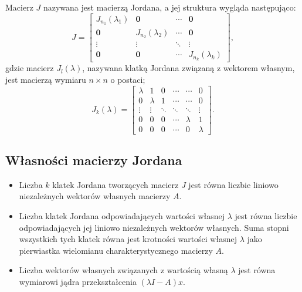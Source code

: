 \documentclass{article}
\begin{document}
Macierz $J$ nazywana jest macierzą Jordana, a jej struktura wygląda następująco:
$$
    J = 
    \left[
    \begin{array}{ccccc}
        J_{n_1}(\lambda_{1})    &   \mathbf{0}              &   \cdots  &   \mathbf{0}\\
        \mathbf{0}              &   J_{n_2}(\lambda_{2})    &   \cdots  &   \mathbf{0}\\
        \vdots                  &   \vdots                  &   \ddots  &   \vdots\\
        \mathbf{0}              &   \mathbf{0}              &   \cdots  &   J_{n_k}(\lambda_{k})
    \end{array}
    \right],
$$
gdzie macierz $J_{l}(\lambda)$, nazywana klatką Jordana związaną z wektorem własnym, jest macierzą wymiaru $n \times n$ o postaci;
$$
    J_{k}(\lambda)
    =
    \begin{bmatrix}
        \lambda & 1         & 0       &  \cdots & \cdots    & 0\\
        0       & \lambda   & 1       &  \cdots & \cdots    & 0\\
        \vdots  & \vdots    & \ddots  &  \ddots & \ddots    & \vdots\\
        0       & 0         & 0       &  \cdots & \lambda   & 1\\
        0       & 0         & 0       &  \cdots & 0         & \lambda
    \end{bmatrix}.
$$

\subsection{Własności macierzy Jordana}
\begin{itemize}
    \item Liczba $k$ klatek Jordana tworzących macierz $J$ jest równa liczbie liniowo niezależnych wektorów własnych macierzy $A$.
    \item Liczba klatek Jordana odpowiadających wartości własnej $\lambda$ jest równa liczbie odpowiadających jej liniowo niezależnych wektorów własnych.
    Suma stopni wszystkich tych klatek równa jest krotności wartości własnej $\lambda$ jako pierwiastka wielomianu charakterystycznego macierzy $A$.
    \item Liczba wektorów własnych związanych z wartością własną $\lambda$ jest równa wymiarowi jądra przekształcenia $(\lambda I - A)x$.
\end{itemize}
\end{document}
